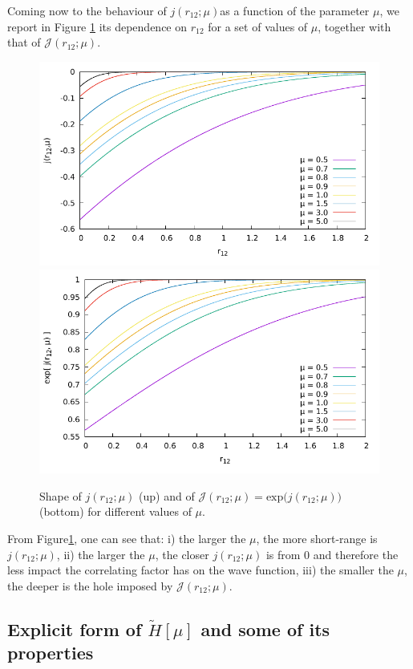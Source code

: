 \documentclass[aip,jcp,reprint,noshowkeys,superscriptaddress]{revtex4-1}
\begin{document}
Coming now to the behaviour of $j(r_{12};\mu)$as a function of the parameter $\mu$, we report in Figure \ref{fig_j_mu} its dependence on $r_{12}$ for a set of values of $\mu$, together with that of $\mathcal{J}(r_{12};\mu)$. 
\begin{figure}
 \label{fig_j_mu}
        \includegraphics[width=0.45\linewidth]{small_mu_j.pdf}
        \includegraphics[width=0.45\linewidth]{small_mu_exp_j.pdf}\\
        \caption{Shape of $j(r_{12};\mu)$ (up) and of $\mathcal{J}(r_{12};\mu) = \text{exp}\bigg(j(r_{12};\mu) \bigg) $ (bottom) for different values of $\mu$.}
\end{figure}
From Figure\ref{fig_j_mu}, one can see that: i) the larger the $\mu$, the more short-range is $j(r_{12};\mu)$, ii) the larger the $\mu$, the closer $j(r_{12};\mu)$ is from 0 and therefore the less impact the correlating factor has on the wave function, iii) the smaller the $\mu$, the deeper is the hole imposed by $\mathcal{J}(r_{12};\mu)$. 


\subsection{Explicit form of  $\tilde{H}[\mu]$ and some of its properties}
\end{document}
